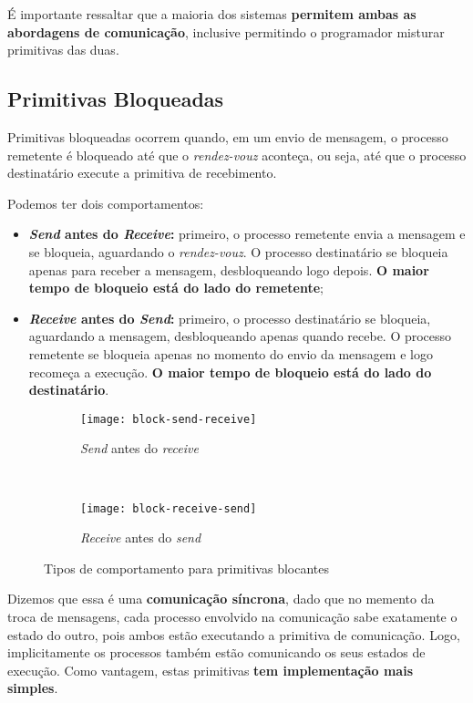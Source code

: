 É importante ressaltar que a maioria dos sistemas \textbf{permitem ambas as abordagens de comunicação}, inclusive permitindo o programador misturar primitivas das duas.

\subsection{Primitivas Bloqueadas}
Primitivas bloqueadas ocorrem quando, em um envio de mensagem, o processo remetente é bloqueado até que o \textit{rendez-vouz} aconteça, ou seja, até que o processo destinatário execute a primitiva de recebimento.

Podemos ter dois comportamentos:
\begin{itemize}
  \item \textbf{\textit{Send} antes do \textit{Receive}:} primeiro, o processo remetente envia a mensagem e se bloqueia, aguardando o \textit{rendez-vouz}. O processo destinatário se bloqueia apenas para receber a mensagem, desbloqueando logo depois. \textbf{O maior tempo de bloqueio está do lado do remetente};

  \item \textbf{\textit{Receive} antes do \textit{Send}:} primeiro, o processo destinatário se bloqueia, aguardando a mensagem, desbloqueando apenas quando recebe. O processo remetente se bloqueia apenas no momento do envio da mensagem e logo recomeça a execução. \textbf{O maior tempo de bloqueio está do lado do destinatário}.
\end{itemize}

\begin{figure*}[ht]
  \begin{subfigure}[t]{0.5\textwidth}
    \centering
    \texttt{[image: block-send-receive]}
    \caption{\textit{Send} antes do \textit{receive}}
    \label{subfig:block-send-receive}
  \end{subfigure}
  ~
  \begin{subfigure}[t]{0.5\textwidth}
    \centering
    \texttt{[image: block-receive-send]}
    \caption{\textit{Receive} antes do \textit{send}}
    \label{subfig:block-receive-send}
  \end{subfigure}

  \caption{Tipos de comportamento para primitivas blocantes}
  \label{fig:blocking-types}
\end{figure*}

Dizemos que essa é uma \textbf{comunicação síncrona}, dado que no memento da troca de mensagens, cada processo envolvido na comunicação sabe exatamente o estado do outro, pois ambos estão executando a primitiva de comunicação. Logo, implicitamente os processos também estão comunicando os seus estados de execução. Como vantagem, estas primitivas \textbf{tem implementação mais simples}.


